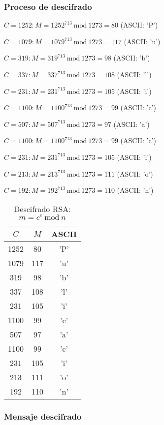 {\subsubsection{Proceso de descifrado}

$C = 1252: M = 1252^{713} ~\text{mod}~ 1273 = 80$ (ASCII: 'P')

$C = 1079: M = 1079^{713} ~\text{mod}~ 1273 = 117$ (ASCII: 'u')

$C = 319: M = 319^{713} ~\text{mod}~ 1273 = 98$ (ASCII: 'b')

$C = 337: M = 337^{713} ~\text{mod}~ 1273 = 108$ (ASCII: 'l')

$C = 231: M = 231^{713} ~\text{mod}~ 1273 = 105$ (ASCII: 'i')

$C = 1100: M = 1100^{713} ~\text{mod}~ 1273 = 99$ (ASCII: 'c')

$C = 507: M = 507^{713} ~\text{mod}~ 1273 = 97$ (ASCII: 'a')

$C = 1100: M = 1100^{713} ~\text{mod}~ 1273 = 99$ (ASCII: 'c')

$C = 231: M = 231^{713} ~\text{mod}~ 1273 = 105$ (ASCII: 'i')

$C = 213: M = 213^{713} ~\text{mod}~ 1273 = 111$ (ASCII: 'o')

$C = 192: M = 192^{713} ~\text{mod}~ 1273 = 110$ (ASCII: 'n')

\begin{table}[h]
\centering
\begin{tabular}{|c|c|c|}
\hline
$C$ & $M$ & ASCII \\ \hline
1252 & 80 & 'P' \\ \hline
1079 & 117 & 'u' \\ \hline
319 & 98 & 'b' \\ \hline
337 & 108 & 'l' \\ \hline
231 & 105 & 'i' \\ \hline
1100 & 99 & 'c' \\ \hline
507 & 97 & 'a' \\ \hline
1100 & 99 & 'c' \\ \hline
231 & 105 & 'i' \\ \hline
213 & 111 & 'o' \\ \hline
192 & 110 & 'n' \\ \hline
\end{tabular}
\caption{Descifrado RSA: $m = c^e ~\text{mod}~ n$}
\label{tab:descifrado}
\end{table}

\subsubsection{Mensaje descifrado}

}
